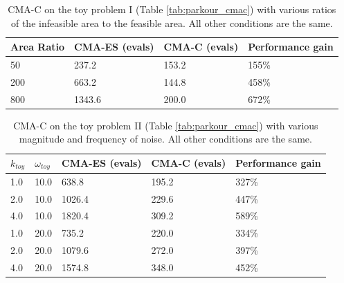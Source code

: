 
\begin{table}[ht]
  \caption{CMA-C on the toy problem I (Table \ref{tab:parkour_cmac}) with various ratios of the infeasible area to the feasible area.
    All other conditions are the same.}
  \center
  \begin{tabular}{ | p{2.5cm} | p{2.5cm} | p{2.5cm} | p{2.5cm} |}
    \hline
    Area Ratio & CMA-ES (evals) & CMA-C (evals) & Performance gain \\ \hline
    50 &  237.2 & 153.2 & 155\% \\ \hline
    200 &  663.2 & 144.8 & 458\% \\ \hline
    800 & 1343.6 & 200.0 & 672\% \\ \hline
  \end{tabular}
  \label{tab:parkour_toy_area_ratio_test}
\end{table}



\begin{table}[ht]
  \caption{CMA-C on the toy problem II (Table \ref{tab:parkour_cmac}) 
      with various magnitude and frequency of noise.
      All other conditions are the same.}
  \centering
  \begin{tabular}{ | p{0.8cm} | p{0.8cm} | p{2.1cm} | p{2.1cm} | p{3.0cm} |}
    \hline
    $k_{toy}$ & $\omega_{toy}$
    & CMA-ES (evals) & CMA-C (evals) & Performance gain \\ \hline
    1.0 & 10.0  &  638.8 &  195.2 & 327\% \\ \hline
    2.0 & 10.0 & 1026.4 & 229.6 & 447\% \\ \hline
    4.0 & 10.0 & 1820.4 & 309.2 & 589\% \\ \hline
    1.0 & 20.0 & 735.2 & 220.0 & 334\% \\ \hline
    2.0 & 20.0 & 1079.6 & 272.0 & 397\% \\ \hline
    4.0 & 20.0 & 1574.8 & 348.0 & 452\% \\ \hline
  \end{tabular}
  \label{tab:parkour_toy_noise_test}
\end{table}

